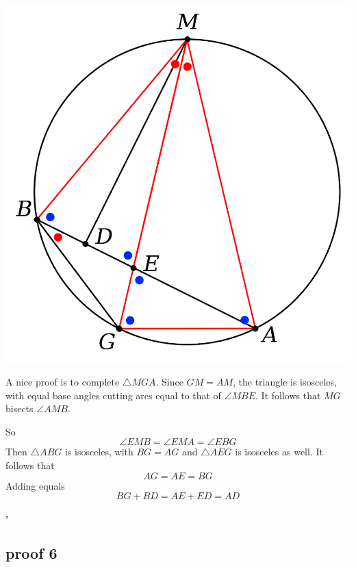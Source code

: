 \documentclass[11pt, oneside]{article}
\begin{document}
\begin{center} \includegraphics [scale=0.40] {bc5c.png} \end{center}

A nice proof is to complete $\triangle MGA$.  Since $GM = AM$, the triangle is isosceles, with equal base angles cutting arcs equal to that of $\angle MBE$.  It follows that $MG$ bisects $\angle AMB$.

So
\[ \angle EMB = \angle EMA = \angle EBG \]
Then $\triangle ABG$ is isosceles, with $BG = AG$ and $\triangle AEG$ is isosceles as well.  It follows that
\[ AG = AE = BG \]
Adding equals
\[ BG + BD = AE + ED = AD \]

$\square$

\newpage

\subsection*{proof 6}
\end{document}
